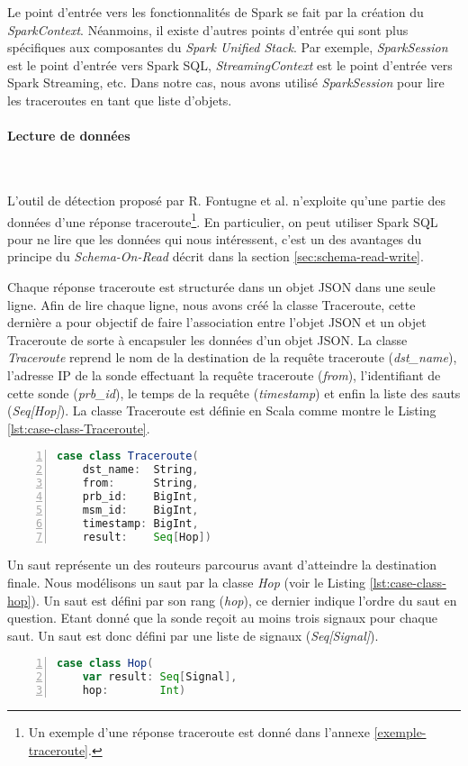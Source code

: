Le point d'entrée vers les fonctionnalités de Spark se fait par la création du  \textit{SparkContext}. 
Néanmoins, il existe d'autres points d'entrée qui sont plus spécifiques aux composantes du \textit{Spark Unified Stack}. Par exemple,  \textit{SparkSession}  est le point d'entrée vers Spark SQL, \textit{StreamingContext} est le point d'entrée vers Spark Streaming, etc.
Dans notre cas, nous avons utilisé \textit{SparkSession} pour lire les traceroutes en tant que liste d'objets.



\paragraph{Lecture de données}~

L'outil de détection proposé par R. Fontugne et al. n'exploite qu'une partie des données d'une réponse traceroute\footnote{Un exemple d'une réponse  traceroute  est donné dans l'annexe \ref{exemple-traceroute}.}.
En particulier, on peut utiliser Spark SQL pour  ne lire que les données qui nous intéressent, c'est un des avantages du principe du \textit{Schema-On-Read} décrit dans la section \ref{sec:schema-read-write}. 

Chaque réponse traceroute est structurée dans un objet JSON dans une seule ligne. Afin de lire chaque ligne, nous avons créé la classe Traceroute, cette dernière  a pour objectif de faire l'association entre l'objet JSON  et un objet Traceroute de sorte à encapsuler les données d'un objet JSON. La classe \textit{Traceroute} reprend le nom de la destination de la requête traceroute (\textit{dst\_name}), l'adresse IP de la sonde effectuant la requête traceroute (\textit{from}), l'identifiant de cette sonde (\textit{prb\_id}), le temps de la requête (\textit{timestamp}) et enfin la liste des sauts (\textit{Seq[Hop]}). La classe Traceroute est définie en Scala comme montre le Listing \ref{lst:case-class-Traceroute}.


\begin{lstlisting}[language=scala,firstnumber=1, caption={Définition de la  classe Traceroute},label={lst:case-class-Traceroute}, basicstyle = \footnotesize,escapechar=|,numbers=left,
stepnumber=1]
case class Traceroute(
	dst_name:  String,
	from:      String,
	prb_id:    BigInt,
	msm_id:    BigInt,
	timestamp: BigInt,
	result:    Seq[Hop])
\end{lstlisting}

Un saut  représente un des routeurs parcourus avant d'atteindre la destination finale. Nous modélisons un saut  par la classe \textit{Hop} (voir le Listing \ref{lst:case-class-hop}). Un saut  est défini par son rang (\textit{hop}), ce dernier indique l'ordre du saut en question. Etant donné que la sonde reçoit au moins trois  signaux pour chaque saut. Un saut est donc défini par une liste de signaux (\textit{Seq[Signal]}).
\begin{lstlisting}[language=scala,firstnumber=1, caption={Définition de la  classe Hop},label={lst:case-class-hop}, basicstyle = \footnotesize,escapechar=|,numbers=left,
stepnumber=1]
case class Hop(
	var result: Seq[Signal],
	hop:        Int)
\end{lstlisting}

